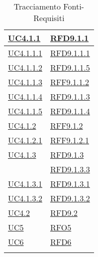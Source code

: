 \begin{longtable}{|>{\centering}m{5cm}|m{5cm}<{\centering}|}
\hyperref[UC4.1.1]{UC4.1.1} & \hyperlink{RFD9.1.1}{RFD9.1.1}\\ \hline
\hyperref[UC4.1.1.1]{UC4.1.1.1} & \hyperlink{RFD9.1.1.1}{RFD9.1.1.1}\\ \hline
\hyperref[UC4.1.1.2]{UC4.1.1.2} & \hyperlink{RFD9.1.1.5}{RFD9.1.1.5}\\ \hline
\hyperref[UC4.1.1.3]{UC4.1.1.3} & \hyperlink{RFF9.1.1.2}{RFF9.1.1.2}\\ \hline
\hyperref[UC4.1.1.4]{UC4.1.1.4} & \hyperlink{RFD9.1.1.3}{RFD9.1.1.3}\\ \hline
\hyperref[UC4.1.1.5]{UC4.1.1.5} & \hyperlink{RFD9.1.1.4}{RFD9.1.1.4}\\ \hline
\hyperref[UC4.1.2]{UC4.1.2} & \hyperlink{RFF9.1.2}{RFF9.1.2}\\ \hline
\hyperref[UC4.1.2.1]{UC4.1.2.1} & \hyperlink{RFF9.1.2.1}{RFF9.1.2.1}\\ \hline
\hyperref[UC4.1.3]{UC4.1.3} & \hyperlink{RFD9.1.3}{RFD9.1.3}\\
& \hyperlink{RFD9.1.3.3}{RFD9.1.3.3}\\ \hline
\hyperref[UC4.1.3.1]{UC4.1.3.1} & \hyperlink{RFD9.1.3.1}{RFD9.1.3.1}\\ \hline
\hyperref[UC4.1.3.2]{UC4.1.3.2} & \hyperlink{RFD9.1.3.2}{RFD9.1.3.2}\\ \hline
\hyperref[UC4.2]{UC4.2} & \hyperlink{RFD9.2}{RFD9.2}\\ \hline
\hyperref[UC5]{UC5} & \hyperlink{RFO5}{RFO5}\\ \hline
\hyperref[UC6]{UC6} & \hyperlink{RFD6}{RFD6}\\ \hline
\caption[Tracciamento Fonti-Requisiti]{Tracciamento Fonti-Requisiti}
\label{tabella:fonti-requi}
\end{longtable}
\clearpage
